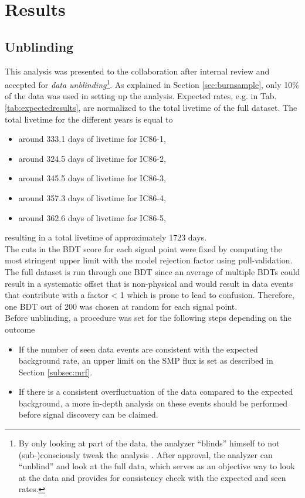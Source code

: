 \section{Results}
\label{sec:results}
\subsection{Unblinding}
This analysis was presented to the collaboration after internal review and accepted for \textit{data unblinding}\footnote{By only looking at part of the data, the analyzer ``blinds'' himself to not (sub-)consciously tweak the analysis \cite{Roodman:2003rw}. After approval, the analyzer can ``unblind'' and look at the full data, which serves as an objective way to look at the data and provides for consistency check with the expected and seen rates.}. As explained in Section \ref{sec:burnsample}, only 10\% of the data was used in setting up the analysis. Expected rates, e.g. in Tab. \ref{tab:expectedresults}, are normalized to the total livetime of the full dataset. The total livetime for the different years is equal to
\vspace{2mm}
\begin{itemize}
\item around 333.1 days of livetime for IC86-1,
\item around 324.5 days of livetime for IC86-2,
\item around 345.5 days of livetime for IC86-3,
\item around 357.3 days of livetime for IC86-4,
\item around 362.6 days of livetime for IC86-5,
\end{itemize}
\vspace{2mm}

\noindent resulting in a total livetime of approximately 1723 days.\\

\noindent The cuts in the BDT score for each signal point were fixed by computing the most stringent upper limit with the model rejection factor using pull-validation. The full dataset is run through one BDT since an average of multiple BDTs could result in a systematic offset that is non-physical and would result in data events that contribute with a factor < 1 which is prone to lead to confusion. Therefore, one BDT out of 200 was chosen at random for each signal point.\\

\noindent Before unblinding, a procedure was set for the following steps depending on the outcome 
\vspace{2mm}
\begin{itemize}
\item If the number of seen data events are consistent with the expected background rate, an upper limit on the SMP flux is set as described in Section \ref{subsec:mrf}.
\item If there is a consistent overfluctuation of the data compared to the expected background, a more in-depth analysis on these events should be performed before signal discovery can be claimed.
\end{itemize}
\vspace{2mm}

